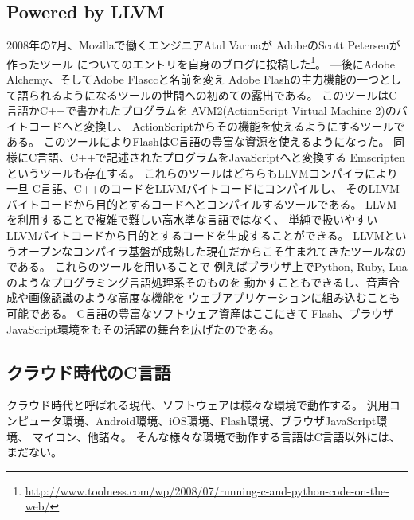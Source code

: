 \subsection{Powered by LLVM} %
2008年の7月、Mozillaで働くエンジニアAtul Varmaが
AdobeのScott Petersenが作ったツール
についてのエントリを自身のブログに投稿した\footnote{\url{http://www.toolness.com/wp/2008/07/running-c-and-python-code-on-the-web/}}。
---後にAdobe Alchemy、そしてAdobe Flasccと名前を変え
Adobe Flashの主力機能の一つとして語られるようになるツールの世間への初めての露出である。
このツールはC言語かC++で書かれたプログラムを
AVM2(ActionScript Virtual Machine 2)のバイトコードへと変換し、
ActionScriptからその機能を使えるようにするツールである。
このツールによりFlashはC言語の豊富な資源を使えるようになった。
同様にC言語、C++で記述されたプログラムをJavaScriptへと変換する
Emscriptenというツールも存在する。
これらのツールはどちらもLLVMコンパイラにより一旦
C言語、C++のコードをLLVMバイトコードにコンパイルし、
そのLLVMバイトコードから目的とするコードへとコンパイルするツールである。
LLVMを利用することで複雑で難しい高水準な言語ではなく、
単純で扱いやすいLLVMバイトコードから目的とするコードを生成することができる。
LLVMというオープンなコンパイラ基盤が成熟した現在だからこそ生まれてきたツールなのである。
これらのツールを用いることで
例えばブラウザ上でPython, Ruby, Luaのようなプログラミング言語処理系そのものを
動かすこともできるし、音声合成や画像認識のような高度な機能を
ウェブアプリケーションに組み込むことも可能である。
C言語の豊富なソフトウェア資産はここにきて
Flash、ブラウザJavaScript環境をもその活躍の舞台を広げたのである。

\subsection{クラウド時代のC言語}
クラウド時代と呼ばれる現代、ソフトウェアは様々な環境で動作する。
汎用コンピュータ環境、Android環境、iOS環境、Flash環境、ブラウザJavaScript環境、
マイコン、他諸々。
そんな様々な環境で動作する言語はC言語以外には、まだない。

% 
% 
% 

